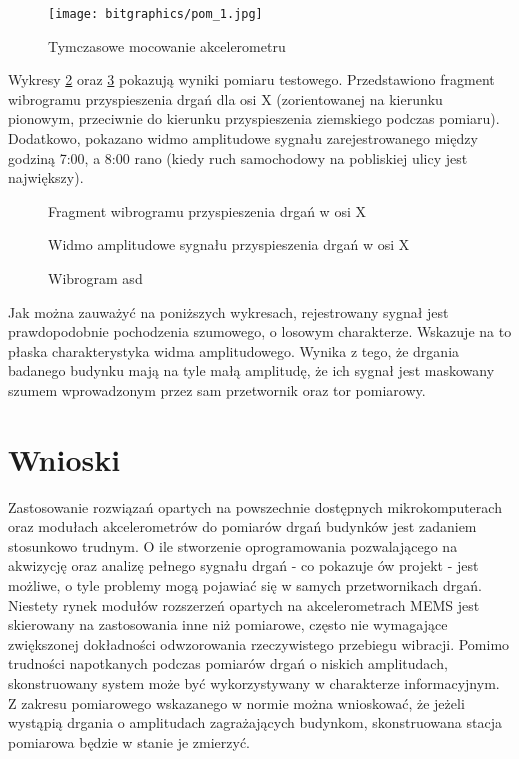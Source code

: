 \documentclass[a4paper,12pt]{mwart}
\let\Oldsection\section
\renewcommand{\section}{\FloatBarrier\Oldsection}
\begin{document}
\begin{figure}[!tbh]
  \centering
  \texttt{[image: bitgraphics/pom\_1.jpg]}
  \caption{Tymczasowe mocowanie akcelerometru}
  \label{fig:imadlo}
\end{figure}

Wykresy \ref{plot:accel_x} oraz \ref{plot:power_x} pokazują wyniki pomiaru
testowego. Przedstawiono fragment wibrogramu przyspieszenia drgań dla osi X
(zorientowanej na kierunku pionowym, przeciwnie do kierunku przyspieszenia
ziemskiego podczas pomiaru). Dodatkowo, pokazano widmo amplitudowe sygnału
zarejestrowanego między godziną 7:00, a 8:00 rano (kiedy ruch samochodowy na
pobliskiej ulicy jest największy).

\begin{figure}[!tbh]
  \centering
  
  \caption{Fragment wibrogramu przyspieszenia drgań w osi X}
  \label{plot:accel_x}
\end{figure}

\begin{figure}[!tbh]
  \centering
  
  \caption{Widmo amplitudowe sygnału przyspieszenia drgań w osi X}
  \label{plot:power_x}
\end{figure}

\begin{figure}[!tbh]
  \centering
  
  \caption{Wibrogram asd}
  \label{plot:accel_2_xyz}
\end{figure}

Jak można zauważyć na poniższych wykresach, rejestrowany sygnał jest
prawdopodobnie pochodzenia szumowego, o losowym charakterze. Wskazuje na to
płaska charakterystyka widma amplitudowego. Wynika z tego, że drgania badanego
budynku mają na tyle małą amplitudę, że ich sygnał jest maskowany szumem
wprowadzonym przez sam przetwornik oraz tor pomiarowy.

\section{Wnioski}

Zastosowanie rozwiązań opartych na powszechnie dostępnych mikrokomputerach oraz
modułach akcelerometrów do pomiarów drgań budynków jest zadaniem stosunkowo
trudnym. O ile stworzenie oprogramowania pozwalającego na akwizycję oraz analizę
pełnego sygnału drgań - co pokazuje ów projekt - jest możliwe, o tyle problemy
mogą pojawiać się w samych przetwornikach drgań. Niestety rynek modułów
rozszerzeń opartych na akcelerometrach MEMS jest skierowany na zastosowania inne
niż pomiarowe, często nie wymagające zwiększonej dokładności odwzorowania
rzeczywistego przebiegu wibracji. Pomimo trudności napotkanych podczas pomiarów
drgań o niskich amplitudach, skonstruowany system może być wykorzystywany w
charakterze informacyjnym. Z zakresu pomiarowego wskazanego w normie można
wnioskować, że jeżeli wystąpią drgania o amplitudach zagrażających budynkom,
skonstruowana stacja pomiarowa będzie w stanie je zmierzyć.
\end{document}
